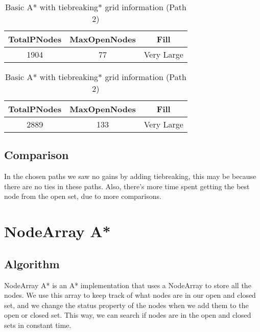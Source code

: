 \documentclass{article}
\begin{document}
  \begin{table}[h!]
    \parbox{.45\linewidth}{
        \centering
        \caption{Basic A* with tiebreaking grid information (Path 1)}
        \label{tab:tableA*TiebreakingGrid1}
        \begin{tabular}{c|c|c}
          \textbf{TotalPNodes} & \textbf{MaxOpenNodes} & \textbf{Fill}\\
          \hline
          1904 & 77 & Very Large\\
        \end{tabular}
    }
    \hfil
    \parbox{.45\linewidth}{
        \centering
        \caption{Basic A* with tiebreaking* grid information (Path 2)}
        \label{tab:tableA*TiebreakingGrid2}
        \begin{tabular}{c|c|c}
          \textbf{TotalPNodes} & \textbf{MaxOpenNodes} & \textbf{Fill}\\
          \hline
          2889 & 133 & Very Large\\
        \end{tabular}
    }
  \end{table}
  \subsection{Comparison}
  In the chosen paths we saw no gains by adding tiebreaking, this may be because there are no ties in these paths. Also, there's more time spent getting 
  the best node from the open set, due to more comparisons.\\
  
  \section{NodeArray A*}
  \subsection{Algorithm}
  NodeArray A* is an A* implementation that uses a NodeArray to store all the nodes. We use this array to keep track of what nodes are in our open and closed set, 
  and we change the status property of the nodes when we add them to the open or closed set. This way, we can search if nodes are in the open and closed sets in constant time.\\
  
\end{document}
